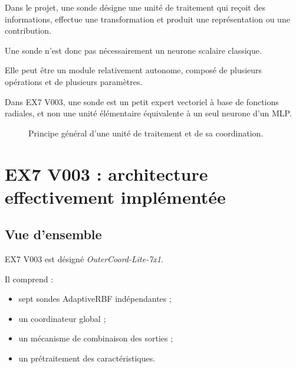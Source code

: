 \documentclass[11pt,a4paper]{report}
\begin{document}
Dans le projet, une sonde désigne une unité de traitement
qui reçoit des informations, effectue une transformation
et produit une représentation ou une contribution.

Une sonde n'est donc pas nécessairement un neurone scalaire
classique.

Elle peut être un module relativement autonome, composé
de plusieurs opérations et de plusieurs paramètres.

Dans EX7 V003, une sonde est un petit expert vectoriel
à base de fonctions radiales, et non une unité élémentaire
équivalente à un seul neurone d'un MLP.

\begin{figure}[H]
\centering
{}
\caption{Principe général d'une unité de traitement et de sa coordination.}
\end{figure}

\chapter{EX7 V003 : architecture effectivement implémentée}

\section{Vue d'ensemble}

EX7 V003 est désigné \textit{OuterCoord-Lite-7x1}.

Il comprend :

\begin{itemize}
  \item sept sondes AdaptiveRBF indépendantes ;
  \item un coordinateur global ;
  \item un mécanisme de combinaison des sorties ;
  \item un prétraitement des caractéristiques.
\end{itemize}
\end{document}
